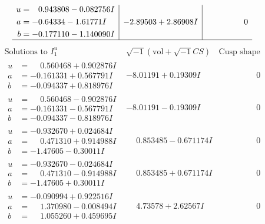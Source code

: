 \documentclass[1p]{elsarticle_modified}
\theoremstyle{definition}
\newcommand{\I}{\sqrt{-1}}
\begin{document}
$$\begin{array}{c|c|c}
\begin{aligned}
u &= \phantom{-}0.943808 - 0.082756 I \\
a &= -0.64334 - 1.61771 I \\
b &= -0.177110 - 1.140090 I\end{aligned}
 & -2.89503 + 2.86908 I & \phantom{-0.000000 } 0\\
 \hline 
 \end{array}$$\newpage$$\begin{array}{c|c|c}  
\text{Solutions to }I^u_{1}& \I (\text{vol} + \sqrt{-1}CS) & \text{Cusp shape}\\
 \hline 
\begin{aligned}
u &= \phantom{-}0.560468 + 0.902876 I \\
a &= -0.161331 + 0.567791 I \\
b &= -0.094337 + 0.818976 I\end{aligned}
 & -8.01191 + 0.19309 I & \phantom{-0.000000 } 0 \\ \hline\begin{aligned}
u &= \phantom{-}0.560468 - 0.902876 I \\
a &= -0.161331 - 0.567791 I \\
b &= -0.094337 - 0.818976 I\end{aligned}
 & -8.01191 - 0.19309 I & \phantom{-0.000000 } 0 \\ \hline\begin{aligned}
u &= -0.932670 + 0.024684 I \\
a &= \phantom{-}0.471310 + 0.914988 I \\
b &= -1.47605 - 0.30011 I\end{aligned}
 & \phantom{-}0.853485 - 0.671174 I & \phantom{-0.000000 } 0 \\ \hline\begin{aligned}
u &= -0.932670 - 0.024684 I \\
a &= \phantom{-}0.471310 - 0.914988 I \\
b &= -1.47605 + 0.30011 I\end{aligned}
 & \phantom{-}0.853485 + 0.671174 I & \phantom{-0.000000 } 0 \\ \hline\begin{aligned}
u &= -0.090994 + 0.922516 I \\
a &= \phantom{-}1.370980 - 0.008494 I \\
b &= \phantom{-}1.055260 + 0.459695 I\end{aligned}
 & \phantom{-}4.73578 + 2.62567 I & \phantom{-0.000000 } 0 \\ \hline\begin{aligned}

\end{aligned}
\end{array}$$
\end{document}

